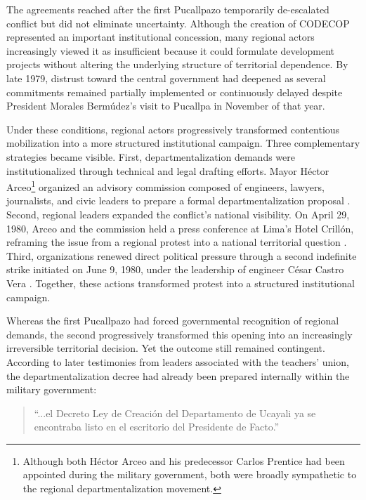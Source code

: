 \documentclass[12pt]{article}
\begin{document}
The agreements reached after the first Pucallpazo temporarily de-escalated conflict but did not eliminate uncertainty. Although the creation of CODECOP represented an important institutional concession, many regional actors increasingly viewed it as insufficient because it could formulate development projects without altering the underlying structure of territorial dependence. By late 1979, distrust toward the central government had deepened as several commitments remained partially implemented or continuously delayed despite President Morales Bermúdez’s visit to Pucallpa in November of that year.

Under these conditions, regional actors progressively transformed contentious mobilization into a more structured institutional campaign. Three complementary strategies became visible. First, departmentalization demands were institutionalized through technical and legal drafting efforts. Mayor Héctor Arceo\footnote{Although both Héctor Arceo and his predecessor Carlos Prentice had been appointed during the military government, both were broadly sympathetic to the regional departmentalization movement.} organized an advisory commission composed of engineers, lawyers, journalists, and civic leaders to prepare a formal departmentalization proposal \parencite{tapuya_huaman_documental_2024}. Second, regional leaders expanded the conflict’s national visibility. On April 29, 1980, Arceo and the commission held a press conference at Lima’s Hotel Crillón, reframing the issue from a regional protest into a national territorial question \parencite{gobierno_regional_de_ucayali_importantes_2016}. Third, organizations renewed direct political pressure through a second indefinite strike initiated on June 9, 1980, under the leadership of engineer César Castro Vera \parencite{vivanco_pimentel_gran_1997}. Together, these actions transformed protest into a structured institutional campaign.

Whereas the first Pucallpazo had forced governmental recognition of regional demands, the second progressively transformed this opening into an increasingly irreversible territorial decision. Yet the outcome still remained contingent. According to later testimonies from leaders associated with the teachers’ union, the departmentalization decree had already been prepared internally within the military government:

\begin{quote}
``...el Decreto Ley de Creación del Departamento de Ucayali ya se encontraba listo en el escritorio del Presidente de Facto.''
\parencite{rengifo_interview_2022-1}
\end{quote}
\end{document}
